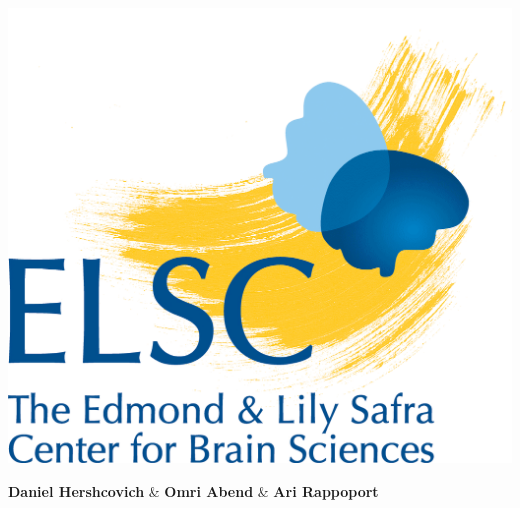 \documentclass[extrafontsizes,60pt,twocolumn]{memoir}
\begin{document}
\begin{strip}
  \begin{center}
  \end{center}
  \begin{center}
  \hspace{6in}
  \begin{minipage}[b]{.08\linewidth}
    \includegraphics[width=\linewidth]{elsc_logo.png}
    \vspace{-2in}
  \end{minipage}
  \hspace{2in}
  \begin{minipage}[b]{.6\linewidth}
    \centering
    \HUGE\textbf{Daniel Hershcovich} \& \textbf{Omri Abend} \& \textbf{Ari Rappoport}
    

\end{minipage}
\end{center}
\end{strip}
\end{document}
